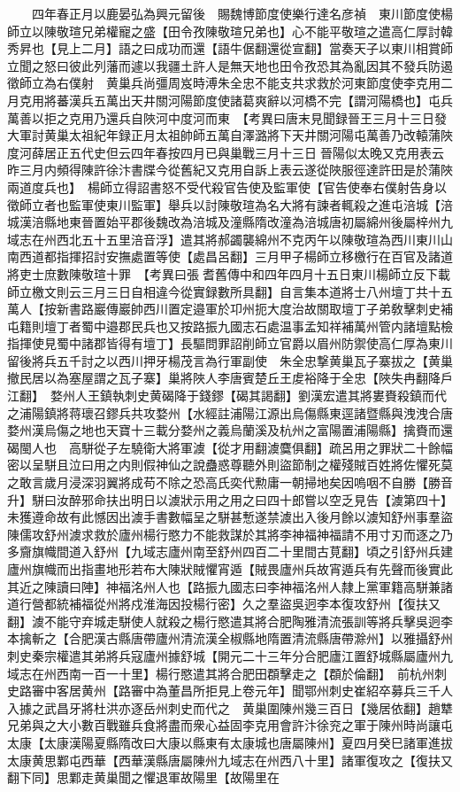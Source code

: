 　　四年春正月以鹿晏弘為興元留後　賜魏博節度使樂行達名彦禎　東川節度使楊師立以陳敬瑄兄弟權寵之盛【田令孜陳敬瑄兄弟也】心不能平敬瑄之遣高仁厚討韓秀昇也【見上二月】語之曰成功而還【語牛倨翻還從宣翻】當奏天子以東川相賞師立聞之怒曰彼此列藩而遽以我疆土許人是無天地也田令孜恐其為亂因其不發兵防遏徵師立為右僕射　黄巢兵尚彊周岌時溥朱全忠不能支共求救於河東節度使李克用二月克用將蕃漢兵五萬出天井關河陽節度使諸葛爽辭以河橋不完【謂河陽橋也】屯兵萬善以拒之克用乃還兵自陜河中度河而東　【考異曰唐末見聞録晉王三月十三日發大軍討黄巢太祖紀年録正月太祖帥師五萬自澤潞將下天井關河陽屯萬善乃改轅蒲陜度河薛居正五代史但云四年春按四月已與巢戰三月十三日晉陽似太晚又克用表云昨三月内頻得陳許徐汴書牒今從舊紀又克用自訴上表云遂從陜服徑達許田是於蒲陜兩道度兵也】　楊師立得詔書怒不受代殺官告使及監軍使【官告使奉右僕射告身以徵師立者也監軍使東川監軍】舉兵以討陳敬瑄為名大將有諫者輒殺之進屯涪城【涪城漢涪縣地東晉置始平郡後魏改為涪城及潼縣隋改潼為涪城唐初屬綿州後屬梓州九域志在州西北五十五里涪音浮】遣其將郝蠲襲綿州不克丙午以陳敬瑄為西川東川山南西道都指揮招討安撫處置等使【處昌呂翻】三月甲子楊師立移檄行在百官及諸道將吏士庶數陳敬瑄十罪　【考異曰張耆舊傳中和四年四月十五日東川楊師立反下載　師立檄文則云三月三日自相違今從實録數所具翻】自言集本道將士八州壇丁共十五萬人【按新書路巖傳巖帥西川置定邉軍於卭州扼大度治故關取壇丁子弟敎擊刺史補屯籍則壇丁者蜀中邉郡民兵也又按路振九國志石處温事孟知祥補萬州管内諸壇點檢指揮使見蜀中諸郡皆得有壇丁】長驅問罪詔削師立官爵以眉州防禦使高仁厚為東川留後將兵五千討之以西川押牙楊茂言為行軍副使　朱全忠撃黄巢瓦子寨拔之【黄巢撤民居以為塞屋謂之瓦子寨】巢將陜人李唐賓楚丘王䖍裕降于全忠【陜失冉翻降戶江翻】　婺州人王鎮執刺史黄碣降于錢鏐【碣其謁翻】劉漢宏遣其將婁賚殺鎮而代之浦陽鎮將蒋瓌召鏐兵共攻婺州【水經註浦陽江源出烏傷縣東逕諸暨縣與洩洩合唐婺州漢烏傷之地也天寶十三載分婺州之義烏蘭溪及杭州之富陽置浦陽縣】擒賚而還碣閩人也　高駢從子左驍衛大將軍澞【從才用翻澞麌俱翻】疏呂用之罪狀二十餘幅密以呈駢且泣曰用之内則假神仙之說蠱惑尊聽外則盜節制之權殘賊百姓將佐懼死莫之敢言歲月浸深羽翼將成苟不除之恐高氏奕代勲庸一朝掃地矣因嗚咽不自勝【勝音升】駢曰汝醉邪命扶出明日以澞狀示用之用之曰四十郎嘗以空乏見告【澞第四十】未獲遵命故有此憾因出澞手書數幅呈之駢甚慙遂禁澞出入後月餘以澞知舒州事羣盜陳儒攻舒州澞求救於廬州楊行愍力不能救謀於其將李神福神福請不用寸刃而逐之乃多齎旗幟間道入舒州【九域志廬州南至舒州四百二十里間古莧翻】頃之引舒州兵建廬州旗幟而出指畫地形若布大陳狀賊懼宵遁【賊畏廬州兵故宵遁兵有先聲而後實此其近之陳讀曰陣】神福洺州人也【路振九國志曰李神福洺州人隸上黨軍籍高駢兼諸道行營都統補福從州將戍淮海因投楊行密】久之羣盜吳迥李本復攻舒州【復扶又翻】澞不能守弃城走駢使人就殺之楊行愍遣其將合肥陶雅清流張訓等將兵擊吳迥李本擒斬之【合肥漢古縣唐帶廬州清流漢全椒縣地隋置清流縣唐帶滁州】以雅攝舒州刺史秦宗權遣其弟將兵寇廬州據舒城【開元二十三年分合肥廬江置舒城縣屬廬州九域志在州西南一百一十里】楊行愍遣其將合肥田頵擊走之【頵於倫翻】　前杭州刺史路審中客居黄州【路審中為董昌所拒見上卷元年】聞鄂州刺史崔紹卒募兵三千人入據之武昌牙將杜洪亦逐岳州刺史而代之　黄巢圍陳州幾三百日【幾居依翻】趙犨兄弟與之大小數百戰雖兵食將盡而衆心益固李克用會許汴徐兖之軍于陳州時尚讓屯太康【太康漢陽夏縣隋改曰大康以縣東有太康城也唐屬陳州】夏四月癸巳諸軍進拔太康黄思鄴屯西華【西華漢縣唐屬陳州九域志在州西八十里】諸軍復攻之【復扶又翻下同】思鄴走黄巢聞之懼退軍故陽里【故陽里在